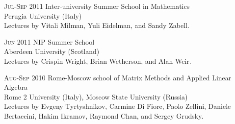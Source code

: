 \begin{paracol}{2}
  \textsc{Jul-Sep 2011}
\switchcolumn
  Inter-university Summer School in Mathematics\\
  Perugia University (Italy)
  {\scriptsize\\
    Lectures by Vitali Milman, Yuli Eidelman, and Sandy Zabell.
  }
\end{paracol}

\begin{paracol}{2}
  \textsc{Jun 2011}
\switchcolumn
  NIP Summer School\\
  Aberdeen University (Scotland)
  {\scriptsize\\
    Lectures by Crispin Wright, Brian Wetherson, and Alan Weir.
  }
\end{paracol}

\begin{paracol}{2}
  \textsc{Aug-Sep 2010}
\switchcolumn
  Rome-Moscow school of Matrix Methods and Applied Linear Algebra\\
  Rome 2 University (Italy), Moscow State University (Russia)
  {\scriptsize\\
    Lectures by Evgeny Tyrtyshnikov, Carmine Di Fiore, Paolo Zellini, Daniele Bertaccini, Hakim Ikramov, Raymond Chan, and Sergey Grudsky.
  }
\end{paracol}